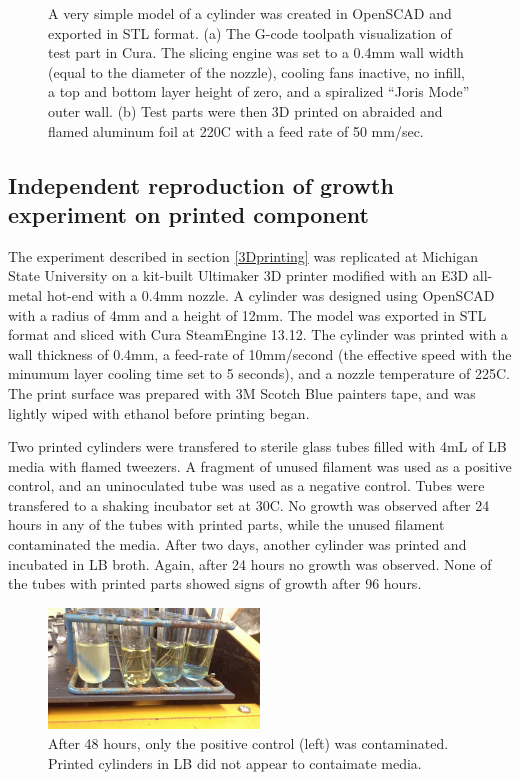 \documentclass[fleqn,10pt]{wlpeerj}
\begin{document}
\begin{figure}
    \caption{A very simple model of a cylinder was created in OpenSCAD and 
    exported in STL format. (a) The G-code toolpath visualization of test part
    in Cura. The slicing engine was set to a 0.4mm wall width (equal to the 
    diameter of the nozzle), cooling fans inactive, no infill, a top and bottom
    layer height of zero, and a spiralized ``Joris Mode'' outer wall. (b) Test
    parts were then 3D printed on abraided and flamed aluminum foil at 220C with
    a feed rate of 50 mm/sec. }
 
    \label{fig:3Dparts}
\end{figure}

\subsection{Independent reproduction of growth experiment on printed component}

The experiment described in section \ref{3Dprinting} was replicated at
Michigan State University on a kit-built Ultimaker 3D printer modified with an
E3D all-metal hot-end with a 0.4mm nozzle. A cylinder was designed using
OpenSCAD with a radius of 4mm and a height of 12mm. The model was exported in
STL format and sliced with Cura SteamEngine 13.12. The cylinder was printed
with a wall thickness of 0.4mm, a feed-rate of 10mm/second (the effective
speed with the minumum layer cooling time set to 5 seconds), and a nozzle
temperature of 225C. The print surface was prepared with 3M Scotch Blue
painters tape, and was lightly wiped with ethanol before printing began.

Two printed cylinders were transfered to sterile glass tubes filled with 4mL
of LB media with flamed tweezers. A fragment of unused filament was used as a
positive control, and an uninoculated tube was used as a negative control.
Tubes were transfered to a shaking incubator set at 30C. No growth was
observed after 24 hours in any of the tubes with printed parts, while the
unused filament contaminated the media. After two days, another cylinder was
printed and incubated in LB broth. Again, after 24 hours no growth was
observed. None of the tubes with printed parts showed signs of growth after 96
hours.

\begin{figure}[h!]
  \centering
    \includegraphics[width=0.5\textwidth]{sterile_print_zaman}

    \caption{After 48 hours, only the positive control (left) was
    contaminated. Printed cylinders in LB did not appear to contaimate
    media.}

\end{figure}
\end{document}
